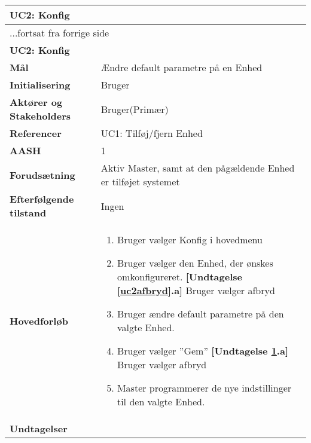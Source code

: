 \begin{center} \centering \label{UC2}
	\begin{longtable}{|p{5cm}|p{9cm}|}  %
	\hline
		\multicolumn{2}{|l|}{\textbf{UC2: Konfig}} \\\hline %
		\endfirsthead
		
		\multicolumn{2}{l}{...fortsat fra forrige side} \\ \hline %
		\multicolumn{2}{|l|}{\textbf{UC2: Konfig}} \\\hline %
		\endhead	
		
		\textbf{Mål}								&Ændre default parametre på en Enhed			\\\hline
		\textbf{Initialisering}					&Bruger							\\\hline
		\textbf{Aktører og Stakeholders}			&Bruger(Primær)					\\\hline
		\textbf{Referencer}						&UC1: Tilføj/fjern Enhed			\\\hline
		\textbf{AASH}							&1								\\\hline
		\textbf{Forudsætning}					&Aktiv Master, samt at den pågældende Enhed er tilføjet systemet					\\\hline
		\textbf{Efterfølgende tilstand}			&Ingen							\\\hline
		\textbf{Hovedforløb}					
			&\begin{enumerate}
	
				\item Bruger vælger Konfig i hovedmenu
				
				\item \label{uc2afbryd}Bruger vælger den Enhed, der ønskes omkonfigureret.
				\textbf{[Undtagelse \ref{uc2afbryd}.a]} \newline
					Bruger vælger afbryd
				
				\item Bruger ændre default parametre på den valgte Enhed.
				
				\item \label{uc2afbryd2} Bruger vælger ''Gem''
				\textbf{[Undtagelse \ref{uc2afbryd2}.a]} \newline
					Bruger vælger afbryd
				
				\item Master programmerer de nye indstillinger til den valgte Enhed. 
	
			\end{enumerate}\\\hline
		\textbf{Undtagelser}
			&\begin{enumerate}[label=\ref{uc2afbryd}.a]
				

\end{enumerate}
\end{longtable}
\end{center}
